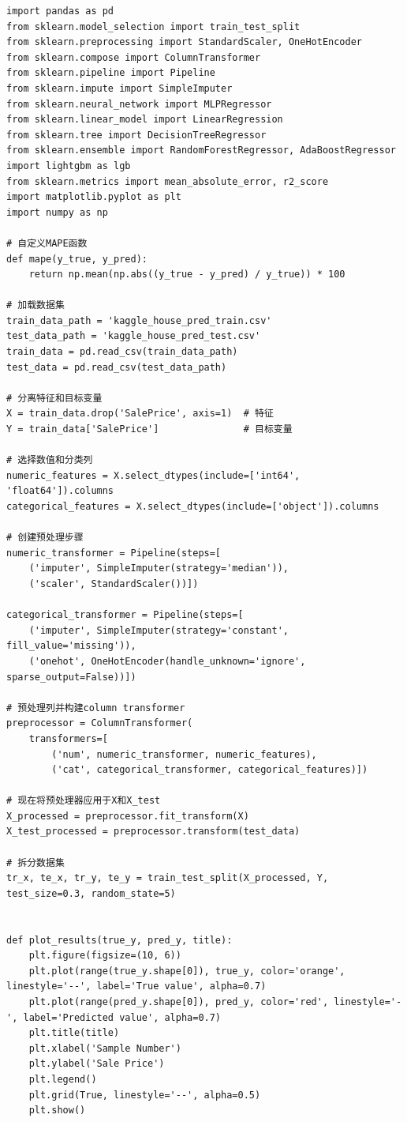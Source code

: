 \documentclass[a4paper,12pt]{article}
\begin{document}
\begin{lstlisting}
import pandas as pd
from sklearn.model_selection import train_test_split
from sklearn.preprocessing import StandardScaler, OneHotEncoder
from sklearn.compose import ColumnTransformer
from sklearn.pipeline import Pipeline
from sklearn.impute import SimpleImputer
from sklearn.neural_network import MLPRegressor
from sklearn.linear_model import LinearRegression
from sklearn.tree import DecisionTreeRegressor
from sklearn.ensemble import RandomForestRegressor, AdaBoostRegressor
import lightgbm as lgb
from sklearn.metrics import mean_absolute_error, r2_score
import matplotlib.pyplot as plt
import numpy as np

# 自定义MAPE函数
def mape(y_true, y_pred):
    return np.mean(np.abs((y_true - y_pred) / y_true)) * 100

# 加载数据集
train_data_path = 'kaggle_house_pred_train.csv'
test_data_path = 'kaggle_house_pred_test.csv'
train_data = pd.read_csv(train_data_path)
test_data = pd.read_csv(test_data_path)

# 分离特征和目标变量
X = train_data.drop('SalePrice', axis=1)  # 特征
Y = train_data['SalePrice']               # 目标变量

# 选择数值和分类列
numeric_features = X.select_dtypes(include=['int64', 'float64']).columns
categorical_features = X.select_dtypes(include=['object']).columns

# 创建预处理步骤
numeric_transformer = Pipeline(steps=[
    ('imputer', SimpleImputer(strategy='median')),
    ('scaler', StandardScaler())])

categorical_transformer = Pipeline(steps=[
    ('imputer', SimpleImputer(strategy='constant', fill_value='missing')),
    ('onehot', OneHotEncoder(handle_unknown='ignore', sparse_output=False))])

# 预处理列并构建column transformer
preprocessor = ColumnTransformer(
    transformers=[
        ('num', numeric_transformer, numeric_features),
        ('cat', categorical_transformer, categorical_features)])

# 现在将预处理器应用于X和X_test
X_processed = preprocessor.fit_transform(X)
X_test_processed = preprocessor.transform(test_data)

# 拆分数据集
tr_x, te_x, tr_y, te_y = train_test_split(X_processed, Y, test_size=0.3, random_state=5)


def plot_results(true_y, pred_y, title):
    plt.figure(figsize=(10, 6))
    plt.plot(range(true_y.shape[0]), true_y, color='orange', linestyle='--', label='True value', alpha=0.7)
    plt.plot(range(pred_y.shape[0]), pred_y, color='red', linestyle='-', label='Predicted value', alpha=0.7)
    plt.title(title)
    plt.xlabel('Sample Number')
    plt.ylabel('Sale Price')
    plt.legend()
    plt.grid(True, linestyle='--', alpha=0.5)
    plt.show()



\end{lstlisting}
\end{document}
